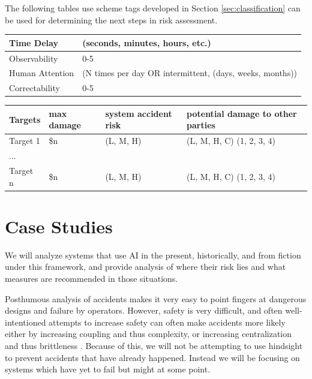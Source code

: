 \documentclass[11pt]{article}
\begin{document}
The following tables use scheme tags developed in Section \ref{sec:classification} can be used for
determining the next steps in risk assessment.


\begin{center}
\begin{tabular}{ |l|l| } 
 \hline
 Time Delay & (seconds, minutes, hours, etc.) \\
 \hline
 Observability & 0-5\\
 \hline
 Human Attention & (N times per day OR intermittent, (days, weeks, months)) \\
 \hline
 Correctability & 0-5 \\
 \hline
\end{tabular}
\end{center}

\begin{center}
\begin{tabular}{ |l|l|l|l| } 
 \hline
 Targets & max damage & system accident risk & potential damage to other parties\\
 \hline
 Target 1 & \$n & (L, M, H) & (L, M, H, C) (1, 2, 3, 4) \\
 ...      &     &           &                           \\
 Target n & \$n & (L, M, H) & (L, M, H, C) (1, 2, 3, 4) \\
 \hline
\end{tabular}
\end{center}


\newpage
\section{Case Studies}

We will analyze systems that use AI in the present, historically, and from fiction under this
framework, and provide analysis of where their risk lies and what measures are recommended in those
situations.

Posthumous analysis of accidents makes it very easy to point fingers at dangerous designs and
failure by operators. However, safety is very difficult, and often well-intentioned attempts to
increase safety can often make accidents more likely either by increasing coupling and thus
complexity, or increasing centralization and thus brittleness \cite{perrow1999living}. Because of
this, we will not be attempting to use hindsight to prevent accidents that have already happened.
Instead we will be focusing on systems which have yet to fail but might at some point.
\end{document}
